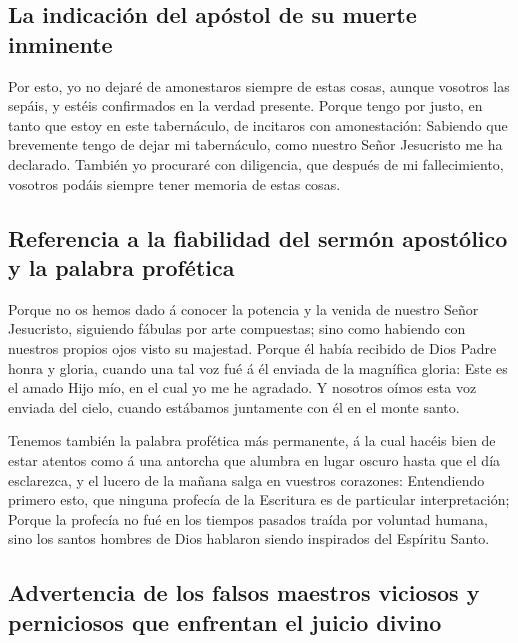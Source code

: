 \hypertarget{la-indicaciuxf3n-del-apuxf3stol-de-su-muerte-inminente}{%
\subsection{La indicación del apóstol de su muerte
inminente}\label{la-indicaciuxf3n-del-apuxf3stol-de-su-muerte-inminente}}

 Por esto, yo no dejaré de amonestaros siempre de estas
cosas, aunque vosotros las sepáis, y estéis confirmados en la verdad
presente.  Porque tengo por justo, en tanto que estoy en
este tabernáculo, de incitaros con amonestación:  Sabiendo
que brevemente tengo de dejar mi tabernáculo, como nuestro Señor
Jesucristo me ha declarado.  También yo procuraré con
diligencia, que después de mi fallecimiento, vosotros podáis siempre
tener memoria de estas cosas.

\hypertarget{referencia-a-la-fiabilidad-del-sermuxf3n-apostuxf3lico-y-la-palabra-profuxe9tica}{%
\subsection{Referencia a la fiabilidad del sermón apostólico y la
palabra
profética}\label{referencia-a-la-fiabilidad-del-sermuxf3n-apostuxf3lico-y-la-palabra-profuxe9tica}}

 Porque no os hemos dado á conocer la potencia y la venida
de nuestro Señor Jesucristo, siguiendo fábulas por arte compuestas; sino
como habiendo con nuestros propios ojos visto su majestad. 
Porque él había recibido de Dios Padre honra y gloria, cuando una tal
voz fué á él enviada de la magnífica gloria: Este es el amado Hijo mío,
en el cual yo me he agradado.  Y nosotros oímos esta voz
enviada del cielo, cuando estábamos juntamente con él en el monte santo.

 Tenemos también la palabra profética más permanente, á la
cual hacéis bien de estar atentos como á una antorcha que alumbra en
lugar oscuro hasta que el día esclarezca, y el lucero de la mañana salga
en vuestros corazones:  Entendiendo primero esto, que
ninguna profecía de la Escritura es de particular interpretación;
 Porque la profecía no fué en los tiempos pasados traída
por voluntad humana, sino los santos hombres de Dios hablaron siendo
inspirados del Espíritu Santo.

\hypertarget{advertencia-de-los-falsos-maestros-viciosos-y-perniciosos-que-enfrentan-el-juicio-divino}{%
\subsection{Advertencia de los falsos maestros viciosos y perniciosos
que enfrentan el juicio
divino}\label{advertencia-de-los-falsos-maestros-viciosos-y-perniciosos-que-enfrentan-el-juicio-divino}}

